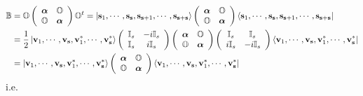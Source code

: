 \documentclass[aps,preprint]{revtex4}%
\begin{document}
\begin{align}
\mathbb{B}  &  =\mathbb{O}\left(
\begin{array}
[c]{cc}%
\boldsymbol{\alpha} & \mathbb{O}\\
\mathbb{O} & \boldsymbol{\alpha}%
\end{array}
\right)  \mathbb{O}^{t}=\left\vert \mathbf{s}_{1},\cdots,\mathbf{s}%
_{\mathbf{s}},\mathbf{s}_{\mathbf{s}+1},\cdots,\mathbf{s}_{\mathbf{s}%
+\mathbf{s}}\right\rangle \left(
\begin{array}
[c]{cc}%
\boldsymbol{\alpha} & \mathbb{O}\\
\mathbb{O} & \boldsymbol{\alpha}%
\end{array}
\right)  \left\langle \mathbf{s}_{1},\cdots,\mathbf{s}_{\mathbf{s}}%
,\mathbf{s}_{\mathbf{s}+1},\cdots,\mathbf{s}_{\mathbf{s}+\mathbf{s}%
}\right\vert \\
&  =\frac{1}{2}\left\vert \mathbf{v}_{1},\cdots,\mathbf{v}_{\mathbf{s}%
},\mathbf{v}_{1}^{\ast},\cdots,\mathbf{v}_{\mathbf{s}}^{\ast}\right\rangle
\left(
\begin{array}
[c]{cc}%
\mathbb{I}_{s} & -i\mathbb{I}_{s}\\
\mathbb{I}_{s} & i\mathbb{I}_{s}%
\end{array}
\right)  \left(
\begin{array}
[c]{cc}%
\boldsymbol{\alpha} & \mathbb{O}\\
\mathbb{O} & \boldsymbol{\alpha}%
\end{array}
\right)  \left(
\begin{array}
[c]{cc}%
\mathbb{I}_{s} & \mathbb{I}_{s}\\
i\mathbb{I}_{s} & -i\mathbb{I}_{s}%
\end{array}
\right)  \left\langle \mathbf{v}_{1},\cdots,\mathbf{v}_{\mathbf{s}}%
,\mathbf{v}_{1}^{\ast},\cdots,\mathbf{v}_{\mathbf{s}}^{\ast}\right\vert \\
&  =\left\vert \mathbf{v}_{1},\cdots,\mathbf{v}_{\mathbf{s}},\mathbf{v}%
_{1}^{\ast},\cdots,\mathbf{v}_{\mathbf{s}}^{\ast}\right\rangle \left(
\begin{array}
[c]{cc}%
\boldsymbol{\alpha} & \mathbb{O}\\
\mathbb{O} & \boldsymbol{\alpha}%
\end{array}
\right)  \left\langle \mathbf{v}_{1},\cdots,\mathbf{v}_{\mathbf{s}}%
,\mathbf{v}_{1}^{\ast},\cdots,\mathbf{v}_{\mathbf{s}}^{\ast}\right\vert
\end{align}
i.e.%
\end{document}
